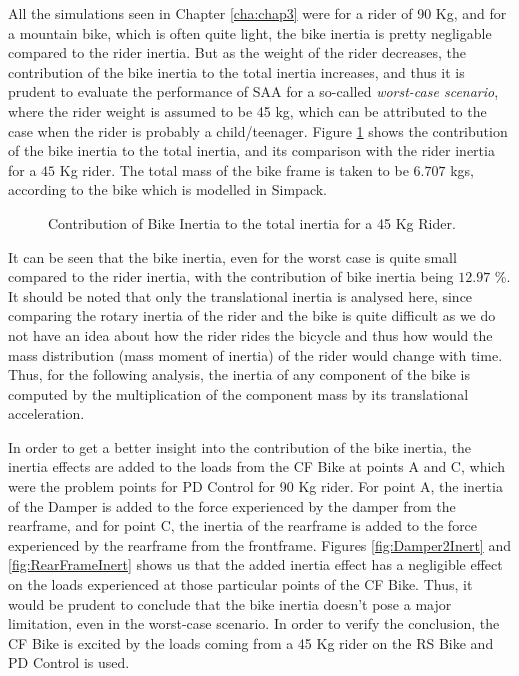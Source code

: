All the simulations seen in Chapter \ref{cha:chap3} were for a rider of 90 Kg, and for a mountain bike, which is often quite light, the bike inertia is pretty negligable compared to the rider inertia. But as the weight of the rider decreases, the contribution of the bike inertia to the total inertia increases, and thus it is prudent to evaluate the performance of SAA for a so-called \emph{worst-case scenario}, where the rider weight is assumed to be 45 kg, which can be attributed to the case when the rider is probably a child/teenager.
Figure \ref{fig:45KgInert} shows the contribution of the bike inertia to the total inertia, and its comparison with the rider inertia for a $45$ Kg rider. The total mass of the bike frame is taken to be $6.707$ kgs, according to the bike which is modelled in Simpack.
\begin{figure}[h]
	\centering
	\scalebox{1.0}{
		\begin{tikzpicture}
			
	\end{tikzpicture}}
	\caption{Contribution of Bike Inertia to the total inertia for a 45 Kg Rider.}
	\label{fig:45KgInert}
\end{figure}

It can be seen that the bike inertia, even for the worst case is quite small compared to the rider inertia, with the contribution of bike inertia being $12.97$ \%. It should be noted that only the translational inertia is analysed here, since comparing the rotary inertia of the rider and the bike is quite difficult as we do not have an idea about how the rider rides the bicycle and thus how would the mass distribution (mass moment of inertia) of the rider would change with time. Thus, for the following analysis, the inertia of any component of the bike is computed by the multiplication of the component mass by its translational acceleration.

In order to get a better insight into the contribution of the bike inertia, the inertia effects are added to the loads from the CF Bike at points A and C, which were the problem points for PD Control for 90 Kg rider. For point A, the inertia of the Damper is added to the force experienced by the damper from the rearframe, and for point C, the inertia of the rearframe is added to the force experienced by the rearframe from the frontframe. Figures \ref{fig:Damper2Inert} and \ref{fig:RearFrameInert} shows us that the added inertia effect has a negligible effect on the loads experienced at those particular points of the CF Bike. Thus, it would be prudent to conclude that the bike inertia doesn't pose a major limitation, even in the worst-case scenario. In order to verify the conclusion, the CF Bike is excited by the loads coming from a 45 Kg rider on the RS Bike and PD Control is used.

